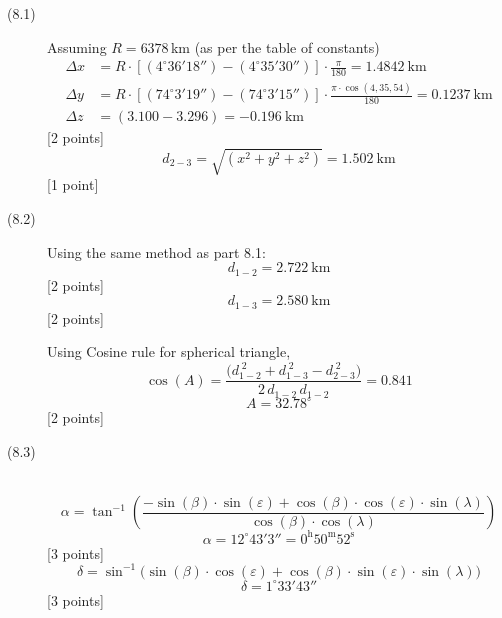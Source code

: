 \begin{description}
\item[(8.1)] Assuming $R = 6378$\,km (as per the table of constants)
  \begin{align*}
    \Delta x &= R \cdot
      \left[(4^\circ 36' 18'') - (4^\circ 35' 30'')\right]
      \cdot \frac{\pi}{180} = 1.4842\ \mathrm{km}\\
    \Delta y &= R \cdot
      \left[(74^\circ 3' 19'') - (74^\circ 3' 15'')\right]
      \cdot \frac{\pi \cdot \cos(4,35,54)}{180} = 0.1237\ \mathrm{km}\\
    \Delta z &= (3.100 - 3.296) = -0.196\ \mathrm{km}
  \end{align*}
  \hfill[2 points]
  \[
    d_{2-3} = \sqrt{(x^2 + y^2 + z^2)} = 1.502\ \mathrm{km}
  \]
  \hfill[1 point]

\item[(8.2)] Using the same method as part 8.1:
  \[
    d_{1-2} = 2.722\ \mathrm{km}
  \]
  \hfill[2 points]
  \[
    d_{1-3} = 2.580\ \mathrm{km}
  \]
  \hfill[2 points]

  Using Cosine rule for spherical triangle,
  \[
    \cos(A) = \frac{\bigl(d_{1-2}^{\;2} + d_{1-3}^{\;2}
                          - d_{2-3}^{\;2}\bigr)}
                   {2\,d_{1-2}\,d_{1-2}} = 0.841
  \]
  \[
    A = 32.78^\circ
  \]
  \hfill[2 points]

\item[(8.3)] ~
  \[
    \alpha = \tan^{-1}\left(
      \frac{-\sin(\beta)\cdot\sin(\varepsilon)
            + \cos(\beta)\cdot\cos(\varepsilon)\cdot\sin(\lambda)}
           {\cos(\beta)\cdot\cos(\lambda)}\right)
  \]
  \[
    \alpha = 12^\circ 43' 3''
           = 0^{\mathrm{h}} 50^{\mathrm{m}} 52^{\mathrm{s}}
  \]
  \hfill[3 points]
  \[
    \delta = \sin^{-1}\bigl(\sin(\beta)\cdot\cos(\varepsilon)
             + \cos(\beta)\cdot\sin(\varepsilon)\cdot\sin(\lambda)\bigr)
  \]
  \[
    \delta = 1^\circ 33' 43''
  \]
  \hfill[3 points]
\end{description}
